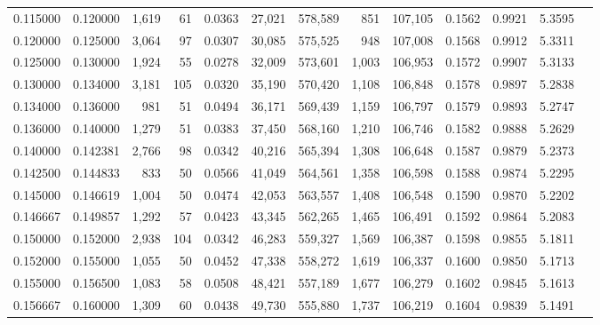 \begin{tabular}{rrrrrrrrrrrrr}
0.115000 & 0.120000 & 1,619 &  61 &                                     0.0363 &  27,021 & 578,589 &     851 & 107,105 & 0.1562 & 0.9921 & 5.3595 \\
0.120000 & 0.125000 & 3,064 &  97 &                                     0.0307 &  30,085 & 575,525 &     948 & 107,008 & 0.1568 & 0.9912 & 5.3311 \\
0.125000 & 0.130000 & 1,924 &  55 &                                     0.0278 &  32,009 & 573,601 &   1,003 & 106,953 & 0.1572 & 0.9907 & 5.3133 \\
0.130000 & 0.134000 & 3,181 & 105 &                                     0.0320 &  35,190 & 570,420 &   1,108 & 106,848 & 0.1578 & 0.9897 & 5.2838 \\
0.134000 & 0.136000 &   981 &  51 &                                     0.0494 &  36,171 & 569,439 &   1,159 & 106,797 & 0.1579 & 0.9893 & 5.2747 \\
0.136000 & 0.140000 & 1,279 &  51 &                                     0.0383 &  37,450 & 568,160 &   1,210 & 106,746 & 0.1582 & 0.9888 & 5.2629 \\
0.140000 & 0.142381 & 2,766 &  98 &                                     0.0342 &  40,216 & 565,394 &   1,308 & 106,648 & 0.1587 & 0.9879 & 5.2373 \\
0.142500 & 0.144833 &   833 &  50 &                                     0.0566 &  41,049 & 564,561 &   1,358 & 106,598 & 0.1588 & 0.9874 & 5.2295 \\
0.145000 & 0.146619 & 1,004 &  50 &                                     0.0474 &  42,053 & 563,557 &   1,408 & 106,548 & 0.1590 & 0.9870 & 5.2202 \\
0.146667 & 0.149857 & 1,292 &  57 &                                     0.0423 &  43,345 & 562,265 &   1,465 & 106,491 & 0.1592 & 0.9864 & 5.2083 \\
0.150000 & 0.152000 & 2,938 & 104 &                                     0.0342 &  46,283 & 559,327 &   1,569 & 106,387 & 0.1598 & 0.9855 & 5.1811 \\
0.152000 & 0.155000 & 1,055 &  50 &                                     0.0452 &  47,338 & 558,272 &   1,619 & 106,337 & 0.1600 & 0.9850 & 5.1713 \\
0.155000 & 0.156500 & 1,083 &  58 &                                     0.0508 &  48,421 & 557,189 &   1,677 & 106,279 & 0.1602 & 0.9845 & 5.1613 \\
0.156667 & 0.160000 & 1,309 &  60 &                                     0.0438 &  49,730 & 555,880 &   1,737 & 106,219 & 0.1604 & 0.9839 & 5.1491 \\

\end{tabular}
